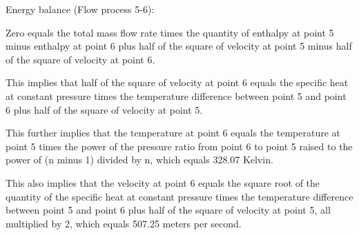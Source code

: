 Energy balance (Flow process 5-6):

Zero equals the total mass flow rate times the quantity of enthalpy at point 5 minus enthalpy at point 6 plus half of the square of velocity at point 5 minus half of the square of velocity at point 6.

This implies that half of the square of velocity at point 6 equals the specific heat at constant pressure times the temperature difference between point 5 and point 6 plus half of the square of velocity at point 5.

This further implies that the temperature at point 6 equals the temperature at point 5 times the power of the pressure ratio from point 6 to point 5 raised to the power of (n minus 1) divided by n, which equals 328.07 Kelvin.

This also implies that the velocity at point 6 equals the square root of the quantity of the specific heat at constant pressure times the temperature difference between point 5 and point 6 plus half of the square of velocity at point 5, all multiplied by 2, which equals 507.25 meters per second.
